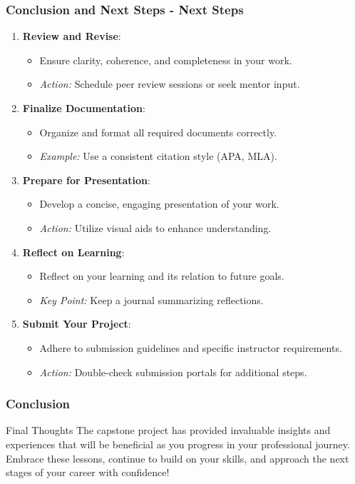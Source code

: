 \documentclass[aspectratio=169]{beamer}
\begin{document}
\begin{frame}[fragile]
    \frametitle{Conclusion and Next Steps - Next Steps}
    \begin{enumerate}
        \item \textbf{Review and Revise}: 
        \begin{itemize}
            \item Ensure clarity, coherence, and completeness in your work.
            \item \textit{Action:} Schedule peer review sessions or seek mentor input.
        \end{itemize}
        
        \item \textbf{Finalize Documentation}: 
        \begin{itemize}
            \item Organize and format all required documents correctly.
            \item \textit{Example:} Use a consistent citation style (APA, MLA).
        \end{itemize}
        
        \item \textbf{Prepare for Presentation}: 
        \begin{itemize}
            \item Develop a concise, engaging presentation of your work.
            \item \textit{Action:} Utilize visual aids to enhance understanding.
        \end{itemize}
        
        \item \textbf{Reflect on Learning}: 
        \begin{itemize}
            \item Reflect on your learning and its relation to future goals.
            \item \textit{Key Point:} Keep a journal summarizing reflections.
        \end{itemize}
        
        \item \textbf{Submit Your Project}: 
        \begin{itemize}
            \item Adhere to submission guidelines and specific instructor requirements.
            \item \textit{Action:} Double-check submission portals for additional steps.
        \end{itemize}
    \end{enumerate}
\end{frame}

\begin{frame}[fragile]
    \frametitle{Conclusion}
    \begin{block}{Final Thoughts}
        The capstone project has provided invaluable insights and experiences that will be beneficial as you progress in your professional journey. 
        Embrace these lessons, continue to build on your skills, and approach the next stages of your career with confidence!
    \end{block}
\end{frame}
\end{document}
